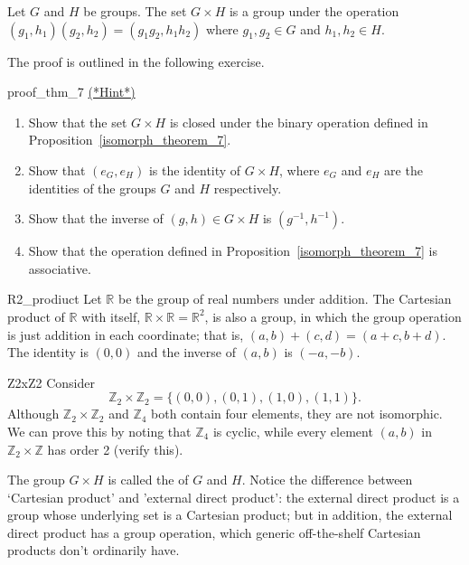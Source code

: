 \begin{thm}\label{isomorph_theorem_7}
Let $G$ and $H$ be groups. The set $G \times H$ is a group under the operation $(g_1, h_1)(g_2, h_2) = (g_1  g_2, h_1 h_2)$ where $g_1, g_2 \in G$ and $h_1, h_2 \in H$. 
\end{thm}
The proof is outlined in the following exercise. 

\begin{exercise}{proof_thm_7}
\hyperref[sec:isomorph:hints]{(*Hint*)}
\begin{enumerate}
\item
Show that the set $G \times H$ is closed under the binary operation defined in Proposition~\ref{isomorph_theorem_7}. 
\item Show that $(e_G, e_H)$ is the identity of $G \times H$,
where $e_G$ and $e_H$ are the identities of the groups $G$ and $H$ respectively.
\item Show that the inverse of $(g, h) \in G \times H$ is $(g^{-1}, h^{-1})$.  
\item Show that the operation defined in Proposition~\ref{isomorph_theorem_7} is associative.
\end{enumerate}
\end{exercise}

\begin{example}{R2_prodiuct}
Let ${\mathbb R}$ be the group of real numbers under addition.  The Cartesian product of ${\mathbb R}$ with itself, ${\mathbb R} \times {\mathbb R} = {\mathbb R}^2$, is also a group, in which the group operation is just addition in each coordinate; that is, $(a, b) + (c, d) = (a + c, b + d)$.  The identity is $(0,0)$ and the inverse of $(a, b)$ is $(-a, -b)$.
\end{example}

\begin{example}{Z2xZ2}
Consider
\[
{\mathbb Z}_2 \times {\mathbb Z}_2 = \{ (0, 0), (0, 1), (1, 0),(1, 1) \}.
\]
Although ${\mathbb Z}_2 \times {\mathbb Z}_2$ and ${\mathbb Z}_4$ both contain four elements,  they are not isomorphic. We can prove this by noting that ${\mathbb Z}_4$ is cyclic, while  every element $(a,b)$ in ${\mathbb Z}_2 \times {\mathbb Z}$ has order 2 (verify this).	
\end{example}

The group $G \times H$ is called the  of  $G$ and $H$. Notice the difference between `Cartesian product' and 'external direct product': the external direct product is a group whose underlying set is a Cartesian product; but in addition, the external direct product has a group operation, which generic off-the-shelf Cartesian products don't ordinarily have. 

